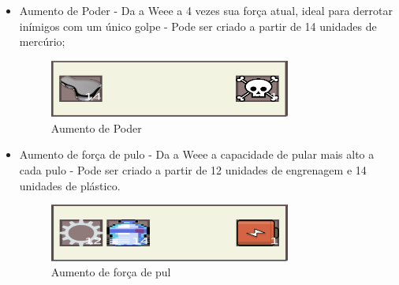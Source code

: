 \begin{itemize}
    \item Aumento de Poder - Da a Weee a 4 vezes sua força atual, ideal para derrotar inímigos com um único golpe - Pode ser criado a partir de 14 unidades de mercúrio;
    \begin{figure}[hbt!]
        \centering
        \includegraphics[width=300px]{figuras/receita.png}
        \caption{Aumento de Poder}
        \label{fig_receita_double_damage}
    \end{figure}
    
    \item Aumento de força de pulo - Da a Weee a capacidade de pular mais alto a cada pulo - Pode ser criado a partir de 12 unidades de engrenagem e 14 unidades de plástico.
    \begin{figure}[hbt!]
        \centering
        \includegraphics[width=300px]{figuras/receita_jump_force.png}
        \caption{Aumento de força de pul}
        \label{fig_receita_jump_force}
    \end{figure}
\end{itemize}

